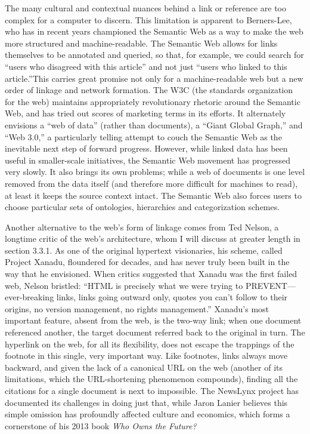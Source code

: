 The many cultural and contextual nuances behind a link or reference are too complex for a computer to discern. This limitation is apparent to Berners-Lee, who has in recent years championed the Semantic Web as a way to make the web more structured and machine-readable. The Semantic Web allows for links themselves to be annotated and queried, so that, for example, we could search for ``users who disagreed with this article'' and not just ``users who linked to this article.''This carries great promise not only for a machine-readable web but a new order of linkage and network formation. The W3C (the standards organization for the web) maintains appropriately revolutionary rhetoric around the Semantic Web, and has tried out scores of marketing terms in its efforts. It alternately envisions a ``web of data'' (rather than documents), a ``Giant Global Graph,'' and ``Web 3.0,'' a particularly telling attempt to couch the Semantic Web as the inevitable next step of forward progress. However, while linked data has been useful in smaller-scale initiatives, the Semantic Web movement has progressed very slowly. It also brings its own problems; while a web of documents is one level removed from the data itself (and therefore more difficult for machines to read), at least it keeps the source context intact. The Semantic Web also forces users to choose particular sets of ontologies, hierarchies and categorization schemes.

Another alternative to the web's form of linkage comes from Ted Nelson, a longtime critic of the web's architecture, whom I will discuss at greater length in section 3.3.1. As one of the original hypertext visionaries, his scheme, called Project Xanadu, floundered for decades, and has never truly been built in the way that he envisioned. When critics suggested that Xanadu was the first failed web, Nelson bristled: ``HTML is precisely what we were trying to PREVENT---ever-breaking links, links going outward only, quotes you can't follow to their origins, no version management, no rights management.''\autocite{nelson_ted_1999} Xanadu's most important feature, absent from the web, is the two-way link; when one document referenced another, the target document referred back to the original in turn. The hyperlink on the web, for all its flexibility, does not escape the trappings of the footnote in this single, very important way. Like footnotes, links always move backward, and given the lack of a canonical URL on the web (another of its limitations, which the URL-shortening phenomenon compounds), finding all the citations for a single document is next to impossible. The NewsLynx project has documented its challenges in doing just that, while Jaron Lanier believes this simple omission has profoundly affected culture and economics, which forms a cornerstone of his 2013 book \emph{Who Owns the Future?}\autocites[Ch. 18]{lanier_who_2013}{abelson_hyper-compensation:_2014}

